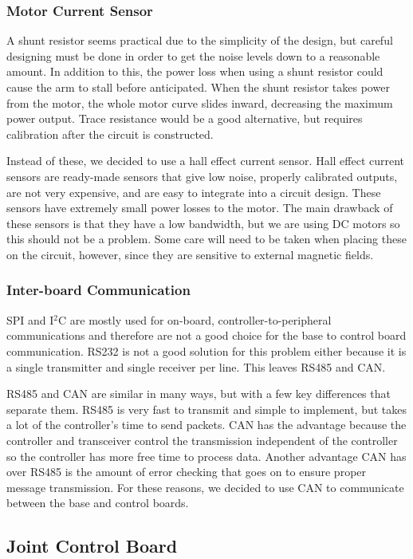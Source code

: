 \subsubsection{Motor Current Sensor}
A shunt resistor seems practical due to the simplicity of the design, but careful designing must be done in order to get the noise levels down to a reasonable amount. In addition to this, the power loss when using a shunt resistor could cause the arm to stall before anticipated. When the shunt resistor takes power from the motor, the whole motor curve slides inward, decreasing the maximum power output. Trace resistance would be a good alternative, but requires calibration after the circuit is constructed. 

\noindent Instead of these, we decided to use a hall effect current sensor. Hall effect current sensors are ready-made sensors that give low noise, properly calibrated outputs, are not very expensive, and are easy to integrate into a circuit design. These sensors have extremely small power losses to the motor. The main drawback of these sensors is that they have a low bandwidth, but we are using DC motors so this should not be a problem. Some care will need to be taken when placing these on the circuit, however, since they are sensitive to external magnetic fields.

\subsubsection{Inter-board Communication}
SPI and I$^2$C are mostly used for on-board, controller-to-peripheral communications and therefore are not a good choice for the base to control board communication. RS232 is not a good solution for this problem either because it is a single transmitter and single receiver per line. This leaves RS485 and CAN.

\noindent RS485 and CAN are similar in many ways, but with a few key differences that separate them. RS485 is very fast to transmit and simple to implement, but takes a lot of the controller's time to send packets. CAN has the advantage because the controller and transceiver control the transmission independent of the controller so the controller has more free time to process data. Another advantage CAN has over RS485 is the amount of error checking that goes on to ensure proper message transmission. For these reasons, we decided to use CAN to communicate between the base and control boards.

\subsection{Joint Control Board}
